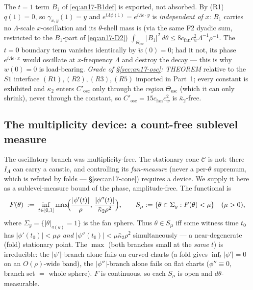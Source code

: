 \begin{remark}\label{an17:rem-B1}
The $t=1$ term $B_1$ of \eqref{eq:an17-B1def} is exported, not absorbed. By (R1)
$q(1)=0$, so $\gamma_{x,y}(1)=y$ and $e^{i\Lambda\phi(1)}=e^{i\Lambda e\cdot y}$
is \emph{independent of $x$}: $B_1$ carries no $\Lambda$-scale $x$-oscillation
and its $\theta$-shell mass is (via the same F2 dyadic sum, restricted to the
$B_1$-part of \eqref{eq:an17-D2}) $\int_{\Theta_{\mathrm{osc}}}|B_1|^2\,d\theta\le
8c_{\mathrm{fan}}c_w^2\Lambda^{-1}\rho^{-1}$. The $t=0$ boundary term vanishes
identically by $\tilde w(0)=0$; had it not, its phase $e^{i\Lambda e\cdot x}$
would oscillate at $x$-frequency $\Lambda$ and destroy the decay --- this is why
$w(0)=0$ is load-bearing. \emph{Grade of \S\ref{sec:an17-osc}: {\rm THEOREM}}
relative to the $S1$ interface $(R1),(R2),(R3),(R5)$ imported in Part~1; every
constant is exhibited and $\bar\kappa_2$ enters $C'_{\mathrm{osc}}$ only through
the \emph{region} $\Theta_{\mathrm{osc}}$ (which it can only shrink), never through
the constant, so $C'_{\mathrm{osc}}=15c_{\mathrm{fan}}c_w^2$ is $\bar\kappa_2$-free.
\end{remark}

\subsection{The multiplicity device: a count-free sublevel measure}
\label{sec:an17-device}

The oscillatory branch was multiplicity-free. The stationary cone $\mathcal C$
is not: there $I_\Lambda$ can carry a caustic, and controlling its
\emph{fan-measure} (never a per-$\theta$ supremum, which is refuted by folds ---
\S\ref{sec:an17-cone}) requires a device. We supply it here as a sublevel-measure
bound of the phase, amplitude-free. The functional is
\begin{equation}\label{eq:an17-devF}
 F(\theta)\;:=\;\inf_{t\in[0,1]}\max\!\Bigl(\frac{|\phi'(t)|}{\rho},\,
 \frac{|\phi''(t)|}{\bar\kappa_2\rho^2}\Bigr),\qquad
 S_\mu:=\{\theta\in\Sigma_y:F(\theta)<\mu\}\quad(\mu>0),
\end{equation}
where $\Sigma_y=\{|\theta|_{g(y)}=1\}$ is the fan sphere. Thus $\theta\in S_\mu$
iff some witness time $t_0$ has $|\phi'(t_0)|<\mu\rho$ \emph{and}
$|\phi''(t_0)|<\mu\bar\kappa_2\rho^2$ simultaneously --- a near-degenerate (fold)
stationary point. The $\max$ (both branches small at the \emph{same} $t$) is
irreducible: the $|\phi'|$-branch alone fails on curved charts (a fold gives
$\inf_t|\phi'|=0$ on an $O(\rho)$-wide band), the $|\phi''|$-branch alone fails
on flat charts ($\phi''\equiv0$, branch set $=$ whole sphere). $F$ is continuous,
so each $S_\mu$ is open and $d\theta$-measurable.

